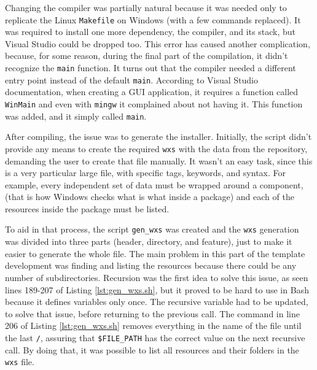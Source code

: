 Changing the compiler was partially natural because it was needed only to replicate the Linux \texttt{Makefile} on Windows (with a few commands replaced). It was required to install one more dependency, the compiler, and its stack, but Visual Studio could be dropped too. This error has caused another complication, because, for some reason, during the final part of the compilation, it didn't recognize the \texttt{main} function. It turns out that the compiler needed a different entry point instead of the default \texttt{main}. According to Visual Studio documentation, when creating a GUI application, it requires a function called \texttt{WinMain} \cite{visualstudio2017entrypoint} and even with \texttt{mingw} it complained about not having it. This function was added, and it simply called \texttt{main}.

After compiling, the issue was to generate the installer. Initially, the script didn't provide any means to create the required \texttt{wxs} with the data from the repository, demanding the user to create that file manually. It wasn't an easy task, since this is a very particular large file, with specific tags, keywords, and syntax. For example, every independent set of data must be wrapped around a component, (that is how Windows checks what is what inside a package) and each of the resources inside the package must be listed.

To aid in that process, the script \texttt{gen\_wxs} was created and the \texttt{wxs} generation was divided into three parts (header, directory, and feature), just to make it easier to generate the whole file. The main problem in this part of the template development was finding and listing the resources because there could be any number of subdirectories. Recursion was the first idea to solve this issue, as seen lines 189-207 of Listing \ref{lst:gen_wxs.sh}, but it proved to be hard to use in Bash because it defines variables only once. The recursive variable had to be updated, to solve that issue, before returning to the previous call. The command in line 206 of Listing \ref{lst:gen_wxs.sh} removes everything in the name of the file until the last \texttt{/}, assuring that \texttt{\$FILE\_PATH} has the correct value on the next recursive call. By doing that, it was possible to list all resources and their folders in the \texttt{wxs} file.





